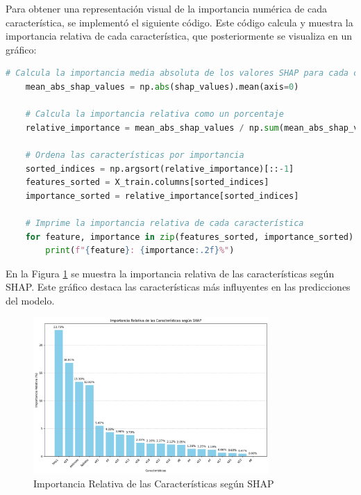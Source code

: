 Para obtener una representación visual de la importancia numérica de cada característica, se implementó el siguiente código. Este código calcula y muestra la importancia relativa de cada característica, que posteriormente se visualiza en un gráfico:

\begin{lstlisting}[language=Python, caption=Codigo de calculo valores SHAP, label=lst:cod_calvaloreshap]
    # Calcula la importancia media absoluta de los valores SHAP para cada característica
    mean_abs_shap_values = np.abs(shap_values).mean(axis=0)
    
    # Calcula la importancia relativa como un porcentaje
    relative_importance = mean_abs_shap_values / np.sum(mean_abs_shap_values) * 100
    
    # Ordena las características por importancia
    sorted_indices = np.argsort(relative_importance)[::-1]
    features_sorted = X_train.columns[sorted_indices]
    importance_sorted = relative_importance[sorted_indices]
    
    # Imprime la importancia relativa de cada característica
    for feature, importance in zip(features_sorted, importance_sorted):
        print(f"{feature}: {importance:.2f}%")
\end{lstlisting}

En la Figura \ref{fig:importancia_relativa_shap} se muestra la importancia relativa de las características según SHAP. Este gráfico destaca las características más influyentes en las predicciones del modelo.

\begin{figure}[H]
    \centering
    \includegraphics[width=0.8\textwidth]{img/shap_rf/importancia_relativa_de_las_caracterticas_segun_shap.png}
    \caption{Importancia Relativa de las Características según SHAP}
    \label{fig:importancia_relativa_shap}
\end{figure}

